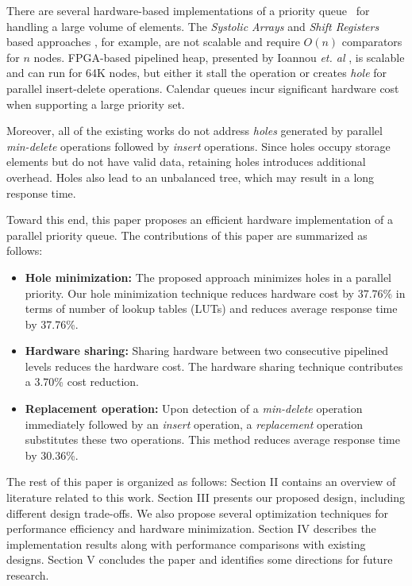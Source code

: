 \documentclass[10pt, conference, compsocconf]{IEEEtran}
\begin{document}
There are several hardware-based implementations of a priority queue~\cite{hw1,hw2,hw8,hw9,fpga1,fpga2,fpga3} for handling a large volume of elements.
The {\it Systolic Arrays} and {\it Shift Registers} based approaches \cite{hw8,hw9}, for example, are not scalable and require $O(n)$ comparators for $n$ nodes.
FPGA-based pipelined heap, presented by Ioannou {\it et. al} \cite{fpga1}, is scalable and can run for 64K nodes, but either it stall the operation or creates {\it hole} for parallel insert-delete operations. Calendar queues \cite{hw1} incur significant hardware cost when supporting a large priority set.

Moreover, all of the existing works do not address {\it holes} generated by parallel {\it min-delete} operations followed by {\it insert} operations.
Since holes occupy storage elements but do not have valid data, retaining holes introduces additional overhead.
Holes also lead to an unbalanced tree, which may result in a long response time.

Toward this end, this paper proposes an efficient hardware implementation of a parallel priority queue.
The contributions of this paper are summarized as follows:
\begin{itemize}
\item {\bf Hole minimization:} The proposed approach minimizes holes in a parallel priority. Our hole minimization technique reduces hardware cost by 37.76\% in terms of number of lookup tables (LUTs) and reduces average response time by 37.76\%.
\item {\bf Hardware sharing:} Sharing hardware between two consecutive pipelined levels reduces the hardware cost. The hardware sharing technique contributes a 3.70\% cost reduction.
\item {\bf Replacement operation:} Upon detection of a {\it min-delete} operation immediately followed by an {\it insert} operation, a {\it replacement} operation substitutes these two operations. This method reduces average response time by 30.36\%.
\end{itemize}

The rest of this paper is organized as follows: Section II contains an overview of literature related to this work.
Section III presents our proposed design, including different design trade-offs. We also propose several optimization techniques for performance efficiency and hardware minimization.
Section IV describes the implementation results along with performance comparisons with existing designs.
Section V concludes the paper and identifies some directions for future research.
\end{document}
